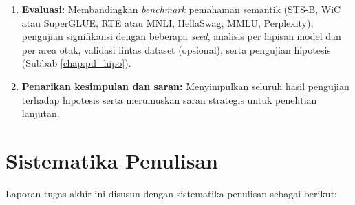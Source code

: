 \begin{enumerate}
    \item \textbf{Evaluasi:} Membandingkan \textit{benchmark} pemahaman semantik (STS-B, WiC atau SuperGLUE, RTE atau MNLI, HellaSwag, MMLU, Perplexity), pengujian signifikansi dengan beberapa \textit{seed}, analisis per lapisan model dan per area otak, validasi lintas dataset (opsional), serta pengujian hipotesis (Subbab \ref{chap:pd_hipo}).
    \item \textbf{Penarikan kesimpulan dan saran:} Menyimpulkan seluruh hasil pengujian terhadap hipotesis serta merumuskan saran strategis untuk penelitian lanjutan.
\end{enumerate}
\vfill %

\section{Sistematika Penulisan}
Laporan tugas akhir ini disusun dengan sistematika penulisan sebagai berikut:
